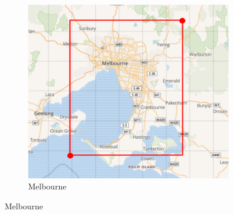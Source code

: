 \begin{figure}[h]
\begin{subfigure}[t]{0.3\textwidth}
        \label{fig:london_bounding_box}
    \end{subfigure}
    \quad
    \begin{subfigure}[t]{0.3\textwidth}
        \centering
        \includegraphics[width=1\linewidth]{figures/melbourne_bb.png}
        \caption{Melbourne}
        \label{fig:melbourne_bounding_box}
    \end{subfigure}
    
    \medskip
    

\end{figure}
